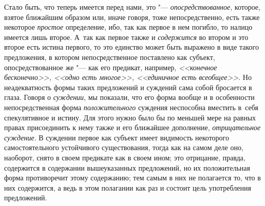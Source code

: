 Стало быть, что теперь имеется перед нами, это "--- {\em опосредствованное},
которое, взятое ближайшим образом или, иначе говоря, тоже
непосредственно, есть также некоторое {\em простое}
определение, ибо, так как первое в нем погибло, то налицо
имеется лишь второе. А~так как первое также и {\em содержится} во
втором и это второе есть истина первого, то это единство может быть
выражено в виде такого предложения, в котором
непосредственное поставлено как субъект, опосредствованное же
"--- как его предикат, например, {\em <<конечное бесконечно>>,
<<одно есть многое>>, <<единичное есть всеобщее>>}.
Но неадекватность формы таких предложений и суждений сама
собой бросается в глаза. Говоря о {\em суждении}, мы
показали, что его форма вообще и в особенности непосредственная форма
{\em положительного}
суждения неспособна вместить в~себя спекулятивное и истину.
Для этого нужно было бы по меньшей мере на равных правах присоединить к
нему также и его ближайшее дополнение,
{\em отрицательное суждение}.
В суждении первое как субъект имеет видимость некоторого
самостоятельного устойчивого существования, тогда как на самом деле оно,
наоборот, снято в своем предикате как в своем ином; это отрицание,
правда, содержится в содержании вышеуказанных предложений, но их
положительная форма противоречит этому содержанию; тем самым в них не
полагается то, что в них содержится, а ведь в этом полагании как раз и
состоит цель употребления предложений.


